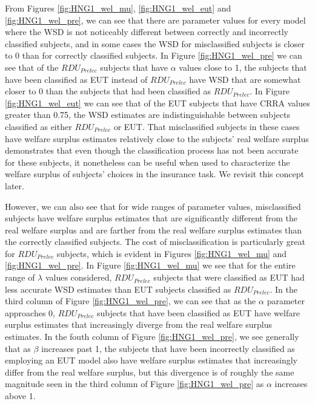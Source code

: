 \documentclass[../main.tex]{subfiles}
\begin{document}
From Figures \ref{fig:HNG1_wel_mu}, \ref{fig:HNG1_wel_eut} and \ref{fig:HNG1_wel_pre}, we can see that there are parameter values for every model where the WSD is not noticeably different between correctly and incorrectly classified subjects, and in some cases the WSD for misclassified subjects is closer to 0 than for correctly classified subjects.
In Figure \ref{fig:HNG1_wel_pre} we can see that of the $\mathit{RDU_{Prelec}}$ subjects that have $\alpha$ values close to 1, the subjects that have been classified as EUT instead of $\mathit{RDU_{Prelec}}$ have WSD that are somewhat closer to 0 than the subjects that had been classified as $\mathit{RDU_{Prelec}}$.
In Figure \ref{fig:HNG1_wel_eut} we can see that of the EUT subjects that have CRRA values greater than 0.75, the WSD estimates are indistinguishable between subjects classified as either $\mathit{RDU_{Prelec}}$ or EUT.
That misclassified subjects in these cases have welfare surplus estimates relatively close to the subjects' real welfare surplus demonstrates that even though the classification process has not been accurate for these subjects, it nonetheless can be useful when used to characterize the welfare surplus of subjects' choices in the insurance task.
We revisit this concept later.

However, we can also see that for wide ranges of parameter values, misclassified subjects have welfare surplus estimates that are significantly different from the real welfare surplus and are farther from the real welfare surplus estimates than the correctly classified subjects.
The cost of misclassification is particularly great for $\mathit{RDU_{Prelec}}$ subjects, which is evident in Figures \ref{fig:HNG1_wel_mu} and \ref{fig:HNG1_wel_pre}.
In Figure \ref{fig:HNG1_wel_mu} we see that for the entire range of $\lambda$ values considered, $\mathit{RDU_{Prelec}}$ subjects that were classified as EUT had less accurate WSD estimates than EUT subjects classified as $\mathit{RDU_{Prelec}}$.
In the third column of Figure \ref{fig:HNG1_wel_pre}, we can see that as the $\alpha$ parameter approaches 0, $\mathit{RDU_{Prelec}}$ subjects that have been classified as EUT have welfare surplus estimates that increasingly diverge from the real welfare surplus estimates.
In the fouth column of Figure \ref{fig:HNG1_wel_pre}, we see generally that as $\beta$ increases past 1, the subjects that have been incorrectly classified as employing an EUT model also have welfare surplus estimates that increasingly differ from the real welfare surplus, but this divergence is of roughly the same magnitude seen in the third column of Figure \ref{fig:HNG1_wel_pre} as $\alpha$ increases above 1.
\end{document}
